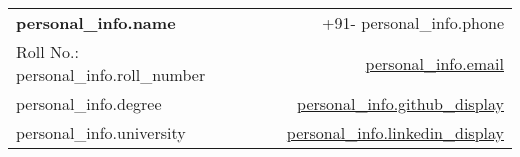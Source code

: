 \documentclass[a4paper,11pt]{article}
\begin{document}
\selectfont

{
\begin{tabularx}{\linewidth}{L r}
  \textbf{\Large {{ personal_info.name }}} & 
  {\raisebox{0.0\height}{\footnotesize \faPhone} +91-{{ personal_info.phone }}} \\
  {Roll No.: {{ personal_info.roll_number }}} & 
  \href{mailto:{{ personal_info.email }}}{\raisebox{0.0\height}{\footnotesize \faEnvelope} {{ personal_info.email }}} \\
  {{ personal_info.degree }} & 
  \href{ {{ '{{' }} personal_info.github_url {{ '}}' }} }{\raisebox{0.0\height}{\footnotesize \faGithub} {{ personal_info.github_display }}} \\  
  {{ personal_info.university }} & 
  \href{ {{ '{{' }} personal_info.linkedin_url {{ '}}' }} }{\raisebox{0.0\height}{\footnotesize \faLinkedin} {{ personal_info.linkedin_display }}}
\end{tabularx}
}


\end{document}
